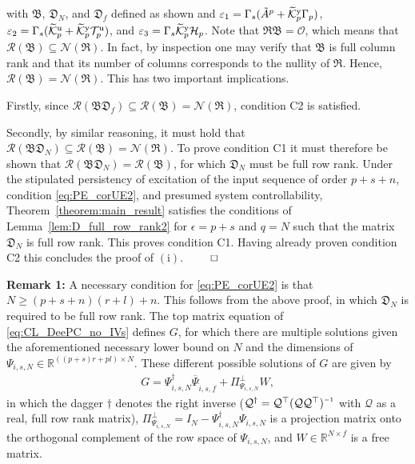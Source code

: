 with $\mathfrak{B}$, $\mathfrak{D}_N$, and $\mathfrak{D}_f$ defined as shown and $\varepsilon_1=\Gamma_s(\tilde{A}^p+\widetilde{\mathcal{K}}_{p}^{\mathrm{{y}}}\Gamma_p)$, $\varepsilon_2=\Gamma_s(\widetilde{\mathcal{K}}_{p}^{\mathrm{{u}}}+\widetilde{\mathcal{K}}_{p}^{\mathrm{{y}}}\mathcal{T}_p^\mathrm{u})$, and $\varepsilon_3=\Gamma_s\widetilde{\mathcal{K}}_{p}^{\mathrm{{y}}}\mathcal{H}_p$. Note that $\mathfrak{RB}=\mathcal{O}$, which means that $\mathcal{R}(\mathfrak{B})\subseteq\mathcal{N}(\mathfrak{R})$. In fact, by inspection one may verify that $\mathfrak{B}$ is full column rank and that its number of columns corresponds to the nullity of $\mathfrak{R}$. Hence, $\mathcal{R}(\mathfrak{B})=\mathcal{N}(\mathfrak{R})$. This has two important implications.

Firstly, since ${\mathcal{R}(\mathfrak{BD}_f)\subseteq\mathcal{R}(\mathfrak{B})=\mathcal{N}(\mathfrak{R})}$, condition C2 is satisfied.

Secondly, by similar reasoning, it must hold that ${\mathcal{R}(\mathfrak{BD}_N)\subseteq\mathcal{R}(\mathfrak{B})=\mathcal{N}(\mathfrak{R})}$. To prove condition C1 it must therefore be shown that $\mathcal{R}(\mathfrak{BD}_N)=\mathcal{R}(\mathfrak{B})$, for which $\mathfrak{D}_N$ must be full row rank. Under the stipulated persistency of excitation of the input sequence of order $p+s+n$, condition \eqref{eq:PE_corUE2}, and presumed system controllability, Theorem~\ref{theorem:main_result} satisfies the conditions of Lemma~\ref{lem:D_full_row_rank2} for $\epsilon=p+s$ and $q=N$ such that the matrix $\mathfrak{D}_N$ is full row rank. This proves condition C1. Having already proven condition C2 this concludes the proof of $\mathrm{(i)}$. $\hfill\qed$

\noindent\textbf{Remark 1:} A necessary condition for \eqref{eq:PE_corUE2} is that ${N\geq(p+s+n)(r+l)+n}$. This follows from the above proof, in which $\mathfrak{D}_N$ is required to be full row rank. The top matrix equation of \eqref{eq:CL_DeePC_no_IVs} defines $G$, for which there are multiple solutions given the aforementioned necessary lower bound on $N$ and the dimensions of $\Psi_{i,s,N}\in\mathbb{R}^{((p+s)r+pl)\times N}$. These different possible solutions of $G$ are given by
\begin{align}%
    G = \Psi_{i,s,N}^\dagger\overline{\Psi}_{\hat{i},s,f} + \Pi_{\Psi_{i,s,N}}^\bot W,
\end{align}
in which the dagger $\dagger$ denotes the right inverse ($\mathcal{Q}^\dagger=\mathcal{Q}^\top(\mathcal{Q}\mathcal{Q}^\top)\inv$ with $\mathcal{Q}$ as a real, full row rank matrix), $\Pi_{\Psi_{i,s,N}}^\bot=I_N-\Psi_{i,s,N}^\dagger\Psi_{i,s,N}$ is a projection matrix onto the orthogonal complement of the row space of $\Psi_{i,s,N}$, %
and $W\in\mathbb{R}^{N\times f}$ is a free matrix.

